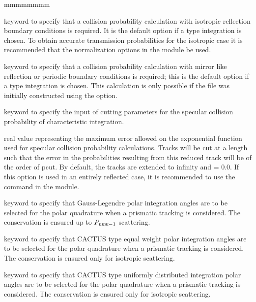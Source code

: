 \begin{ListeDeDescription}{mmmmmmmm}
\item[\moc{PISO}] keyword to specify that a collision probability calculation with isotropic reflection boundary 
conditions is required. It is the default option if a  type integration is chosen. To obtain accurate
transmission probabilities for the isotropic case it is recommended that the normalization 
options in the  module be used. 

\item[\moc{PSPC}] keyword to specify that a collision probability calculation with mirror like reflection or periodic 
boundary conditions is required; this is the default option if a  type integration is chosen. 
This calculation is only possible if the file was initially constructed using the  option. 

\item[\moc{CUT}] keyword to specify the input of cutting parameters for the specular collision probability
of characteristic integration. 

\item[\dusa{pcut}] real value representing the maximum error allowed on the exponential function used
for specular collision probability calculations. Tracks will be cut at a length such that the error in the 
probabilities resulting from this reduced track will be of the order of pcut. By default, the tracks 
are extended to infinity and  = 0.0. If this option is used in an entirely reflected case, it is 
recommended to use the  command in the  module. 

\item[\moc{GAUS}] keyword to specify that Gauss-Legendre polar integration angles are to be selected for the polar quadrature when a prismatic tracking is considered. The conservation is ensured up to $P_{\dusa{nmu}-1}$ scattering.

\item[\moc{CACA}] keyword to specify that CACTUS type equal weight polar integration angles are to be
selected for the polar quadrature when a prismatic tracking is considered.\cite{CACTUS} The conservation is ensured only for isotropic scattering.

\item[\moc{CACB}] keyword to specify that CACTUS type uniformly distributed integration polar angles
are to be selected for the polar quadrature when a prismatic tracking is considered.\cite{CACTUS} The conservation is ensured only for isotropic scattering.


\end{ListeDeDescription}
